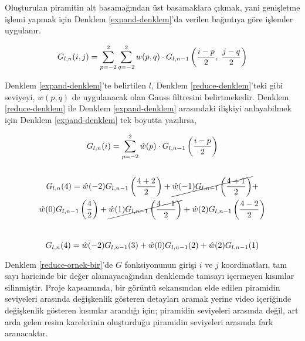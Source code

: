 \documentclass[a4paper, 12pt]{article}
\begin{document}
Oluşturulan piramitin alt basamağından üst basamaklara çıkmak, yani genişletme işlemi yapmak için Denklem \ref{expand-denklem}'da verilen bağıntıya göre işlemler uygulanır. 



\begin{equation}{\label{expand-denklem}}
	G_{l,n}(i,j) = \sum_{p=-2}^{2} \sum_{q=-2}^{2}w(p,q)\cdot G_{l,n-1} \left( \frac{i-p}{2},\; \frac{j-q}{2} \right)
\end{equation}


Denklem \ref{expand-denklem}'te belirtilen $l$, Denklem \ref{reduce-denklem}'teki gibi seviyeyi, $w(p,q)$ de uygulanacak olan Gauss filtresini belirtmekedir. Denklem \ref{reduce-denklem} ile Denklem \ref{expand-denklem} arasındaki ilişkiyi anlayabilmek için Denklem \ref{expand-denklem} tek boyutta yazılırsa,



\begin{equation}{\label{reduce-ornek-bir}}
	\begin{gathered}	
	G_{l,n}(i) = \sum_{p=-2}^{2}\hat{w}(p) \cdot G_{l,n-1}\left(\frac{i-p}{2}\right) 
	\\
		\\
		G_{l,n}(4) = \hat{w}(-2)G_{l,n-1}\left(\frac{4+2}{2}\right) + 
		\cancel{ \hat{w}(-1)G_{l,n-1}\left(\frac{4+1}{2}\right) } + 
		\\
		\hat{w}(0)G_{l,n-1}\left(\frac{4}{2}\right) + 
		\cancel{\hat{w}(1)G_{l,n-1}\left(\frac{4-1}{2}\right) } + 
		\hat{w}(2)G_{l,n-1}\left(\frac{4-2}{2}\right)
	\end{gathered}
\end{equation}
\\

\begin{equation}{\label{reduce-ornek-iki}}
	G_{l,n}(4) = \hat{w}(-2)G_{l,n-1}(3) + \hat{w}(0)G_{l,n-1}(2) + \hat{w}(2)G_{l,n-1}(1)
\end{equation}

Denklem \ref{reduce-ornek-bir}'de $G$ fonksiyonunun girişi $i$ ve $j$ koordinatları, tam sayı haricinde bir değer alamayacağından denklemde tamsayı içermeyen kısımlar silinmiştir.
Proje kapsamında, bir görüntü sekansından elde edilen piramidin seviyeleri arasında değişkenlik gösteren detayları aramak yerine video içeriğinde değişkenlik gösteren kısımlar arandığı için; piramidin seviyeleri arasında değil, art arda gelen resim karelerinin oluşturduğu piramidin seviyeleri arasında fark aranacaktır.

\end{document}

